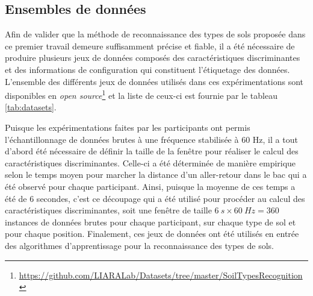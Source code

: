 \subsection{Ensembles de données}

Afin de valider que la méthode de reconnaissance des types de sols proposée dans ce premier travail demeure suffisamment précise et fiable, il a été nécessaire de produire plusieurs jeux de données composés des caractéristiques discriminantes et des informations de configuration qui constituent l'étiquetage des données. L'ensemble des différents jeux de données utilisés dans ces expérimentations sont disponibles en \textit{open source}\footnote{\url{https://github.com/LIARALab/Datasets/tree/master/SoilTypesRecognition}} et la liste de ceux-ci est fournie par le tableau \ref{tab:datasets}.

Puisque les expérimentations faites par les participants ont permis l'échantillonnage de données brutes à une fréquence stabilisée à 60 Hz, il a tout d'abord été nécessaire de définir la taille de la fenêtre pour réaliser le calcul des caractéristiques discriminantes. Celle-ci a été déterminée de manière empirique selon le temps moyen pour marcher la distance d'un aller-retour dans le bac qui a été observé pour chaque participant. Ainsi, puisque la moyenne de ces temps a été de 6 secondes, c'est ce découpage qui a été utilisé pour procéder au calcul des caractéristiques discriminantes, soit une fenêtre de taille $6\:s \times 60\:Hz = 360$ instances de données brutes pour chaque participant, sur chaque type de sol et pour chaque position. Finalement, ces jeux de données ont été utilisés en entrée des algorithmes d'apprentissage pour la reconnaissance des types de sols.

